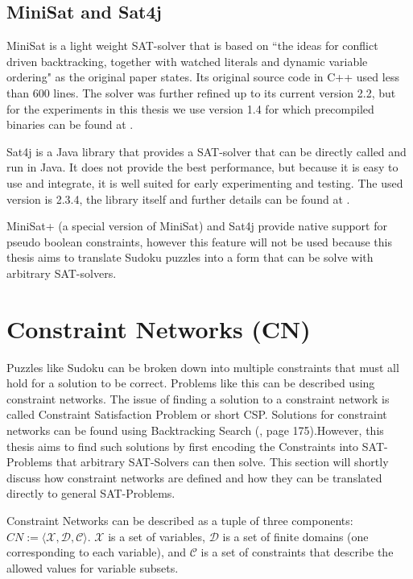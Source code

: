 \subsection{MiniSat and Sat4j}\label{MiniSatAndSat4j}
MiniSat is a light weight SAT-solver that is based on ``the ideas for conflict driven backtracking, together with watched literals and dynamic variable ordering" as the original paper \cite{EenAnExtensibleSAT-solver2004} states. Its original source code in C++ used less than 600 lines. The solver was further refined up to its current version 2.2, but for the experiments in this thesis we use version 1.4 for which precompiled binaries can be found at \cite{webMiniSat}.

Sat4j is a Java library that provides a SAT-solver that can be directly called and run in Java. It does not provide the best performance, but because it is easy to use and integrate, it is well suited for early experimenting and testing. The used version is 2.3.4, the library itself and further details can be found at \cite{webSat4j}.

MiniSat+ (a special version of MiniSat) and Sat4j provide native support for pseudo boolean constraints, however this feature will not be used because this thesis aims to translate Sudoku puzzles into a form that can be solve with arbitrary SAT-solvers.

\section{Constraint Networks (CN)}
Puzzles like Sudoku can be broken down into multiple constraints that must all hold for a solution to be correct. Problems like this can be described using constraint networks. The issue of finding a solution to a constraint network is called Constraint Satisfaction Problem or short CSP. Solutions for constraint networks can be found using Backtracking Search (\cite{ArtificialAModernApproach}, page 175).However, this thesis aims to find such solutions by first encoding the Constraints into SAT-Problems that arbitrary SAT-Solvers can then solve. This section will shortly discuss how constraint networks are defined and how they can be translated directly to general SAT-Problems.


Constraint Networks can be described as a tuple of three components: $CN := \langle \mathcal{X},  \mathcal{D},  \mathcal{C}\rangle$.
$\mathcal{X}$ is a set of variables, $\mathcal{D}$ is a set of finite domains (one corresponding to each variable), and $\mathcal{C}$ is a set of constraints that describe the allowed values for variable subsets.

